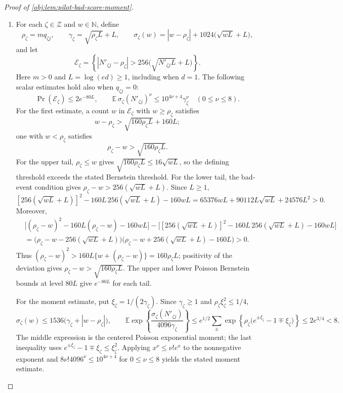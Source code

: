 \documentclass[11pt]{article}
\begin{document}
\begin{proof}[Proof of \cref{obj:lem:pilot-bad-score-moment}]
\begin{enumerate}
\item For each \(\zeta\in\mathcal Z\) and \(w\in\mathbb N\), define
\[
\rho_\zeta=mq_{\zeta j},\qquad
\gamma_\zeta=\sqrt{\rho_\zeta L}+L,\qquad
\sigma_\zeta(w)=|w-\rho_\zeta|+1024\bigl(\sqrt{wL}+L\bigr),
\]
and let
\[
\mathscr E_\zeta
=\left\{|N'_{\zeta j}-\rho_\zeta|
>256\bigl(\sqrt{N'_{\zeta j}L}+L\bigr)\right\}.
\]
Here \(m>0\) and \(L=\log(ed)\geq1\), including when \(d=1\). The following scalar estimates hold also when \(q_{\zeta j}=0\):
\[
\Pr(\mathscr E_\zeta)\leq 2e^{-80L},\qquad
\mathbb E\,\sigma_\zeta(N'_{\zeta j})^\nu
\leq 10^{4\nu+4}\gamma_\zeta^\nu
\quad(0\leq\nu\leq8).
\]
For the first estimate, a count \(w\) in \(\mathscr E_\zeta\) with \(w\geq\rho_\zeta\) satisfies
\[
w-\rho_\zeta>\sqrt{160\rho_\zeta L}+160L;
\]
one with \(w<\rho_\zeta\) satisfies
\[
\rho_\zeta-w>\sqrt{160\rho_\zeta L}.
\]
For the upper tail, \(\rho_\zeta\leq w\) gives \(\sqrt{160\rho_\zeta L}\leq16\sqrt{wL}\), so the defining threshold exceeds the stated Bernstein threshold. For the lower tail, the bad-event condition gives \(\rho_\zeta-w>256(\sqrt{wL}+L)\). Since \(L\geq1\),
\[
[256(\sqrt{wL}+L)]^2-160L\,256(\sqrt{wL}+L)-160wL
=65376wL+90112L\sqrt{wL}+24576L^2>0.
\]
Moreover,
\[
\begin{aligned}
&\bigl[(\rho_\zeta-w)^2-160L(\rho_\zeta-w)-160wL\bigr]
-\bigl[[256(\sqrt{wL}+L)]^2-160L\,256(\sqrt{wL}+L)-160wL\bigr]\\
&=\bigl(\rho_\zeta-w-256(\sqrt{wL}+L)\bigr)
\bigl(\rho_\zeta-w+256(\sqrt{wL}+L)-160L\bigr)>0.
\end{aligned}
\]
Thus \((\rho_\zeta-w)^2>160L\{w+(\rho_\zeta-w)\}=160\rho_\zeta L\); positivity of the deviation gives \(\rho_\zeta-w>\sqrt{160\rho_\zeta L}\). The upper and lower Poisson Bernstein bounds at level \(80L\) give \(e^{-80L}\) for each tail.

For the moment estimate, put \(\xi_\zeta=1/(2\gamma_\zeta)\). Since \(\gamma_\zeta\geq1\) and \(\rho_\zeta\xi_\zeta^2\leq1/4\),
\[
\sigma_\zeta(w)
\leq1536\bigl(\gamma_\zeta+|w-\rho_\zeta|\bigr),
\qquad
\mathbb E\exp\!\left\{
\frac{\sigma_\zeta(N'_{\zeta j})}{4096\gamma_\zeta}
\right\}
\leq
e^{1/2}\!\sum_{\pm}
\exp\!\left\{\rho_\zeta
\bigl(e^{\pm\xi_\zeta}-1\mp\xi_\zeta\bigr)\right\}
\leq 2e^{3/4}<8.
\]
The middle expression is the centered Poisson exponential moment; the last inequality uses
\(e^{\pm\xi_\zeta}-1\mp\xi_\zeta\leq\xi_\zeta^2\).
Applying \(x^\nu\leq\nu!e^x\) to the nonnegative exponent and
\(8\nu!4096^\nu\leq10^{4\nu+4}\) for \(0\leq\nu\leq8\) yields the stated moment estimate.


\end{enumerate}
\end{proof}
\end{document}

